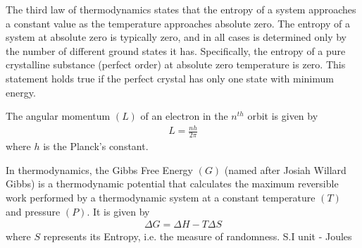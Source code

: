 \begin{chembox}{}
    {The third law of thermodynamics states that the entropy of a system approaches a constant value as the temperature approaches absolute zero. The entropy of a system at absolute zero is typically zero, and in all cases is determined only by the number of different ground states it has. Specifically, the entropy of a pure crystalline substance (perfect order) at absolute zero temperature is zero. This statement holds true if the perfect crystal has only one state with minimum energy.}
\end{chembox}
\begin{phybox}{}
{The {angular momentum} $(L)$ of an {electron} in the $n^{th}$ orbit is given by 
\begin{align*} 
    L = \frac{nh}{2\pi} 
\end{align*} where $h$ is the {Planck's constant}.}
\end{phybox}
\begin{chembox}{}
{In thermodynamics, the {Gibbs Free Energy} $(G)$ (named after Josiah Willard Gibbs) is a {thermodynamic potential} that calculates the {maximum reversible work} performed by a thermodynamic system at a {constant temperature} $(T)$ and pressure{} $(P)$. It is given by 
\begin{align*} 
    \Delta G=\Delta H-T\Delta S 
\end{align*} where $S$ represents its {Entropy}, i.e. the measure of randomness. {S.I unit - Joules}}
\end{chembox}
